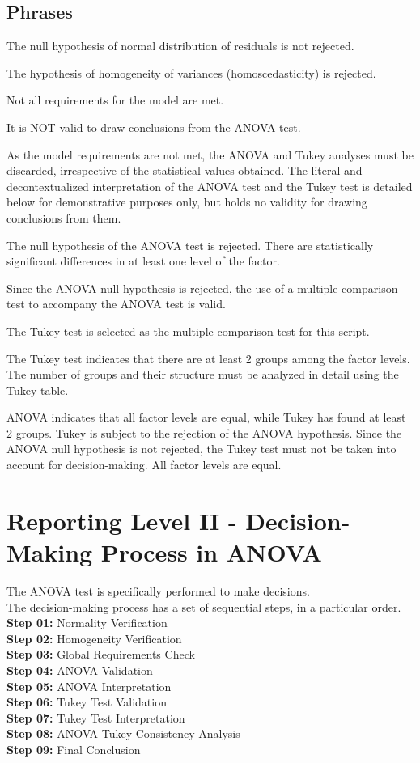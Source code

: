 \documentclass[
  letterpaper,
  DIV=11,
  numbers=noendperiod]{scrartcl}
\begin{document}
\subsection{Phrases}\label{phrases}

The null hypothesis of normal distribution of residuals is not rejected.

The hypothesis of homogeneity of variances (homoscedasticity) is
rejected.

Not all requirements for the model are met.

It is NOT valid to draw conclusions from the ANOVA test.

As the model requirements are not met, the ANOVA and Tukey analyses must
be discarded, irrespective of the statistical values obtained. The
literal and decontextualized interpretation of the ANOVA test and the
Tukey test is detailed below for demonstrative purposes only, but holds
no validity for drawing conclusions from them.

The null hypothesis of the ANOVA test is rejected. There are
statistically significant differences in at least one level of the
factor.

Since the ANOVA null hypothesis is rejected, the use of a multiple
comparison test to accompany the ANOVA test is valid.

The Tukey test is selected as the multiple comparison test for this
script.

The Tukey test indicates that there are at least 2 groups among the
factor levels. The number of groups and their structure must be analyzed
in detail using the Tukey table.

ANOVA indicates that all factor levels are equal, while Tukey has found
at least 2 groups. Tukey is subject to the rejection of the ANOVA
hypothesis. Since the ANOVA null hypothesis is not rejected, the Tukey
test must not be taken into account for decision-making. All factor
levels are equal.

\newpage

\section{Reporting Level II - Decision-Making Process in
ANOVA}\label{reporting-level-ii---decision-making-process-in-anova}

The ANOVA test is specifically performed to make decisions.\\
The decision-making process has a set of sequential steps, in a
particular order.\\
\textbf{Step 01:} Normality Verification\\
\textbf{Step 02:} Homogeneity Verification\\
\textbf{Step 03:} Global Requirements Check\\
\textbf{Step 04:} ANOVA Validation\\
\textbf{Step 05:} ANOVA Interpretation\\
\textbf{Step 06:} Tukey Test Validation\\
\textbf{Step 07:} Tukey Test Interpretation\\
\textbf{Step 08:} ANOVA-Tukey Consistency Analysis\\
\textbf{Step 09:} Final Conclusion
\end{document}
